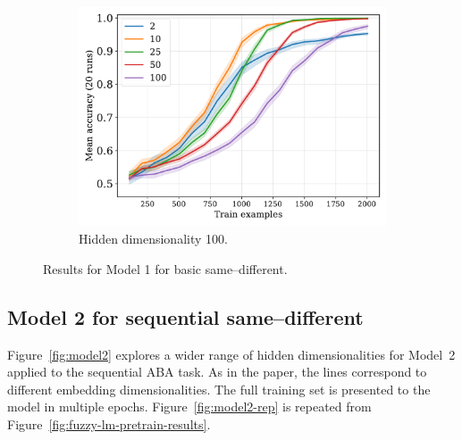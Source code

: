 \documentclass{article}
\newcommand{\Figref}[1]{Figure~\ref{#1}}
\newcommand{\figref}[1]{Figure~\ref{#1}}
\begin{document}
\begin{figure}[H]
  \begin{subfigure}{0.45\linewidth}
    \includegraphics[width=1\textwidth]{./equality-train_size-embed_dim-hidden_dim=100.pdf}
    \caption{Hidden dimensionality 100.}
    \label{fig:model1-rep}
  \end{subfigure}
  \caption{Results for Model 1 for basic same--different.}
  \label{fig:model1}
\end{figure}


\newpage


\subsection{Model 2 for sequential same--different}

\Figref{fig:model2} explores a wider range of hidden dimensionalities for Model~2 applied to the sequential ABA task. As in the paper, the lines correspond to different embedding dimensionalities. The full training set is presented to the model in multiple epochs. \Figref{fig:model2-rep} is repeated from \figref{fig:fuzzy-lm-pretrain-results}.
\end{document}
